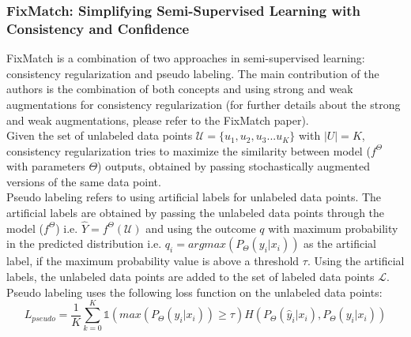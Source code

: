 \subsubsection{FixMatch: Simplifying Semi-Supervised Learning with Consistency and Confidence \cite{sohn2020}}
FixMatch is a combination of two approaches in semi-supervised learning: consistency regularization\cite{sajjadi2016} and pseudo labeling\cite{mclachlan1975}. The main contribution of the authors is the combination of both concepts and using strong and weak augmentations for consistency regularization (for further details about the strong and weak augmentations, please refer to the FixMatch paper). \\
Given the set of unlabeled data points $\mathcal{U} = \{u_1, u_2, u_3 ... u_K\}$ with $|U| = K$, consistency regularization tries to maximize the similarity between model ($f^\Theta$ with parameters $\Theta$) outputs, obtained by passing stochastically augmented versions of the same data point. \\
Pseudo labeling refers to using artificial labels for unlabeled data points. The artificial labels are obtained by passing the unlabeled data points through the model ($f^\Theta$) i.e. $\hat{Y} = f^\Theta(\mathcal{U})$ and using the outcome $q$ with maximum probability in the predicted distribution i.e. $q_i = argmax(P_{\Theta}(y_i | x_i))$ as the artificial label, if the maximum probability value is above a threshold $\tau$. Using the artificial labels, the unlabeled data points are added to the set of labeled data points $\mathcal{L}$. Pseudo labeling uses the following loss function on the unlabeled data points:
\begin{equation}
    \label{equation:fixmatch_pseudo_labeling_loss}
    L_{pseudo} = \frac{1}{K} \sum_{k=0}^{K} \mathbb{1}(max(P_{\Theta}(y_i | x_i)) \geq \tau) H(P_{\Theta}(\hat{y}_i | x_i), P_{\Theta}(y_i | x_i))
\end{equation}

